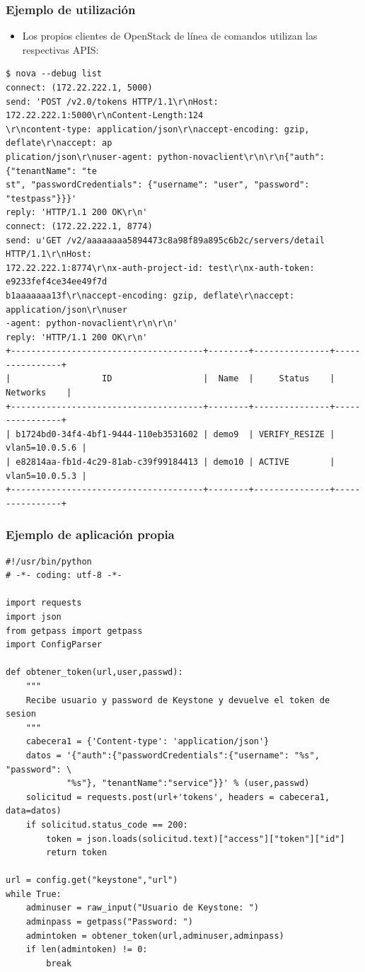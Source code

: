 \documentclass{beamer}
\begin{document}
\begin{frame}[fragile]
  \frametitle{Ejemplo de utilización}
  \begin{itemize}
  \item Los propios clientes de OpenStack de línea de comandos utilizan las
    respectivas APIS:
  \end{itemize}
    \begin{center}
  \begin{lstlisting}
$ nova --debug list
connect: (172.22.222.1, 5000)
send: 'POST /v2.0/tokens HTTP/1.1\r\nHost: 172.22.222.1:5000\r\nContent-Length:124
\r\ncontent-type: application/json\r\naccept-encoding: gzip, deflate\r\naccept: ap
plication/json\r\nuser-agent: python-novaclient\r\n\r\n{"auth": {"tenantName": "te
st", "passwordCredentials": {"username": "user", "password": "testpass"}}}'
reply: 'HTTP/1.1 200 OK\r\n'
connect: (172.22.222.1, 8774)
send: u'GET /v2/aaaaaaaa5894473c8a98f89a895c6b2c/servers/detail HTTP/1.1\r\nHost: 
172.22.222.1:8774\r\nx-auth-project-id: test\r\nx-auth-token: e9233fef4ce34ee49f7d
b1aaaaaaa13f\r\naccept-encoding: gzip, deflate\r\naccept: application/json\r\nuser
-agent: python-novaclient\r\n\r\n'
reply: 'HTTP/1.1 200 OK\r\n'
+--------------------------------------+--------+---------------+----------------+
|                  ID                  |  Name  |     Status    |    Networks    |
+--------------------------------------+--------+---------------+----------------+
| b1724bd0-34f4-4bf1-9444-110eb3531602 | demo9  | VERIFY_RESIZE | vlan5=10.0.5.6 |
| e82814aa-fb1d-4c29-81ab-c39f99184413 | demo10 | ACTIVE        | vlan5=10.0.5.3 |
+--------------------------------------+--------+---------------+----------------+
  \end{lstlisting}
\end{center}
\end{frame}

\begin{frame}[fragile]
  \frametitle{Ejemplo de aplicación propia}
  \begin{lstlisting}
#!/usr/bin/python
# -*- coding: utf-8 -*-

import requests
import json
from getpass import getpass
import ConfigParser

def obtener_token(url,user,passwd):
    """
    Recibe usuario y password de Keystone y devuelve el token de sesion
    """
    cabecera1 = {'Content-type': 'application/json'}
    datos = '{"auth":{"passwordCredentials":{"username": "%s", "password": \
            "%s"}, "tenantName":"service"}}' % (user,passwd)
    solicitud = requests.post(url+'tokens', headers = cabecera1, data=datos)
    if solicitud.status_code == 200:
        token = json.loads(solicitud.text)["access"]["token"]["id"]
        return token

url = config.get("keystone","url")
while True:
    adminuser = raw_input("Usuario de Keystone: ")
    adminpass = getpass("Password: ")
    admintoken = obtener_token(url,adminuser,adminpass)
    if len(admintoken) != 0:
        break
  \end{lstlisting}
\end{frame}
\end{document}
